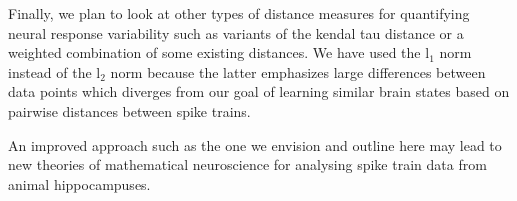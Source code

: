 Finally, we plan to look at other types of distance measures for quantifying neural response variability such as variants of the kendal tau distance 
or a weighted combination of some existing distances. We have used the l$_1$
norm instead of the l$_{2}$ norm because the latter emphasizes large differences between data points which diverges from our goal of learning similar brain states 
based on pairwise distances between spike trains.


An improved approach such as the one we envision and outline here 
may lead to new theories of mathematical neuroscience for analysing spike train data from animal hippocampuses.















